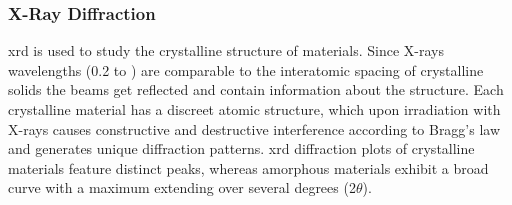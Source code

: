 

\subsubsection{X-Ray Diffraction}
\gls{xrd} is used to study the crystalline structure of materials.
Since X-rays wavelengths (\num{0.2} to ) are comparable to the interatomic spacing of crystalline solids the beams get reflected and contain information about the structure\cite{Kaliva2020}.
Each crystalline material has a discreet atomic structure, which upon irradiation with 
X-rays causes constructive and destructive interference according to Bragg's law and generates unique diffraction patterns. 
\Gls{xrd} diffraction plots of crystalline materials feature distinct peaks, whereas amorphous materials exhibit a broad curve with a maximum extending over several degrees (2$\theta$).


